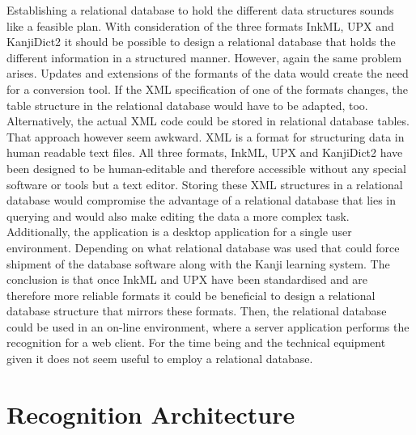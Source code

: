 Establishing a relational database to hold the different data structures 
sounds like a feasible plan. With consideration of the three formats
InkML, UPX and KanjiDict2 it should be possible to design a relational database
that holds the different information in a structured manner.
However, again the same problem arises. Updates and extensions of the formants
of the data would create the need for a conversion tool.
If the XML specification of one of the formats changes, the table structure
in the relational database would have to be adapted, too.
Alternatively, the actual XML code could be stored in relational database 
tables. That approach however seem awkward. XML is a format for structuring
data in human readable text files. All three formats, InkML, UPX and KanjiDict2
have been designed to be human-editable and therefore accessible without
any special software or tools but a text editor.
Storing these XML structures in a relational database would compromise the 
advantage of a relational database that lies in querying and would also
make editing the data a more complex task.
Additionally, the application is a desktop application for a single user 
environment. Depending on what relational database was used that could
force shipment of the database software along with the Kanji learning system.
The conclusion is that once InkML and UPX have been standardised and are
therefore more reliable formats it could be beneficial to design a relational
database structure that mirrors these formats.
Then, the relational database could be used in an on-line environment, 
where a server application performs the recognition for a web client.
For the time being and the technical equipment given it does not seem
useful to employ a relational database.

\section{Recognition Architecture}
\label{sec:hwre:recognitionarchitecture}



